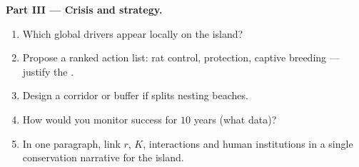 \begin{problem}
\medskip
\noindent\textbf{Part III --- Crisis and strategy.}
\begin{enumerate}[resume]
  \item Which global drivers appear locally on the island?
  \item Propose a ranked action list: rat control,  protection,
        captive breeding --- justify the .
  \item Design a corridor or buffer if  splits nesting
        beaches.
  \item How would you monitor success for $10$ years (what data)?
  \item In one paragraph, link $r$, $K$,  interactions and
        human institutions in a single conservation narrative for the
        island.
\end{enumerate}
\end{problem}
